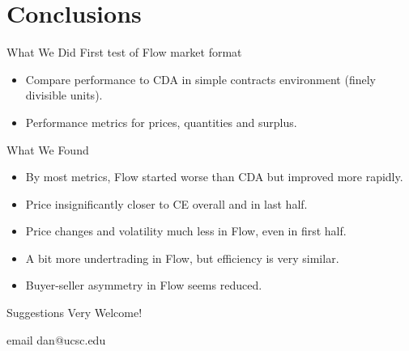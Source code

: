 \documentclass[10pt]{beamer}
\begin{document}
\section{Conclusions}

\begin{frame}{What We Did}
First test of Flow market format
\begin{itemize}
\item Compare performance to CDA in simple contracts environment (finely divisible units). %
\item Performance metrics for prices, quantities and surplus. 
   
    \end{itemize} 
\end{frame}

\begin{frame}{What We Found}
\begin{itemize}
\item By most metrics, Flow started worse than CDA but improved more rapidly.
\item Price insignificantly closer to CE overall and in last half. %
\item Price changes and volatility much less in Flow, even in first half.  %
\item A bit more undertrading in Flow, but efficiency is very similar.
\item Buyer-seller asymmetry in Flow seems reduced.%
    \end{itemize} 

\vspace{.4in}

{\huge Suggestions Very Welcome!}

email dan@ucsc.edu
\end{frame}
\end{document}
